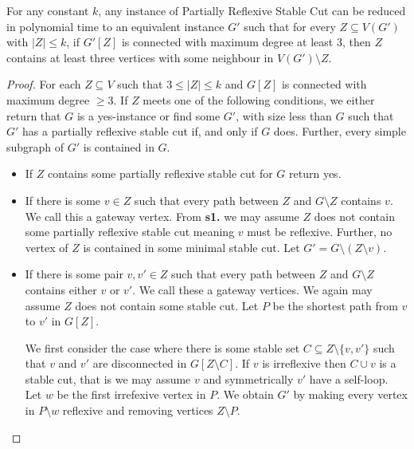 \documentclass[a4paper,UKenglish,cleveref, autoref,thm-restate]{lipics-v2021}
\begin{document}
\begin{lemma}\label{lem:small-cut}
For any constant $k$, any instance of {\sc Partially Reflexive Stable Cut} can be reduced in polynomial time to an equivalent instance $G'$ such that for every $Z \subseteq V(G')$ with $\vert Z \vert \leq k$, if $G'[Z]$ is connected with maximum degree at least $3$, then $Z$ contains at least three vertices with some neighbour in $V(G')\setminus Z$.
\end{lemma}
\begin{proof}
For each $Z \subseteq V$ such that $3 \leq \vert Z \vert \leq k$ and $G[Z]$ is connected with maximum degree $\geq 3$. If $Z$ meets one of the following conditions, we either return that $G$ is a yes-instance or find some $G'$, with size less than $G$ such that $G'$ has a partially reflexive stable cut if, and only if $G$ does. Further, every simple subgraph of $G'$ is contained in $G$.

\begin{itemize}
        \item[\textbf{s1.}] If $Z$ contains some partially reflexive stable cut for $G$ return yes.
        \item[\textbf{s2.}] If there is some $v \in Z$ such that every path between $Z$ and $G \setminus Z$ contains $v$. We call this a gateway vertex. From \textbf{s1.} we may assume $Z$ does not contain some partially reflexive stable cut meaning $v$ must be reflexive. Further, no vertex of $Z$ is contained in some minimal stable cut. Let $G' =G \setminus (Z \setminus v)$.
        \item[\textbf{s3.}] If there is some pair $v,v' \in Z$ such that every path between $Z$ and $G \setminus Z$ contains either $v$ or $v'$. We call these a gateway vertices. We again may assume $Z$ does not contain some stable cut. Let $P$ be the shortest path from $v$ to $v'$ in $G[Z]$.

        We first consider the case where there is some stable set $C \subseteq Z \setminus \{v,v'\}$ such that $v$ and $v'$ are disconnected in $G[Z \setminus C]$. If $v$ is irreflexive then $C \cup v$ is a stable cut, that is we may assume $v$ and symmetrically $v'$ have a self-loop. Let $w$ be the first irrefexive vertex in $P$. We obtain $G'$ by making every vertex in $P \setminus w$ reflexive and removing vertices $Z \setminus P$.


\end{itemize}
\end{proof}
\end{document}

